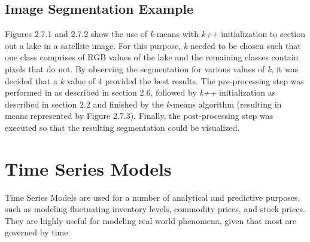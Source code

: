 \documentclass[12pt]{article}
\begin{document}
\subsection {Image Segmentation Example}
  \par Figures 2.7.1 and 2.7.2 show the use of \textit{k}-means with \textit{k++} initialization to section out a lake in a satellite image. For this purpose, \textit{k} needed to be chosen such that one class comprises of RGB values of the lake and the remaining classes contain pixels that do not. By observing the segmentation for various values of \textit{k}, it was decided that a \textit{k} value of 4 provided the best results. The pre-processing step was performed in as described in section 2.6, followed by \textit{k++} initialization as described in section 2.2 and finished by the \textit{k}-means algorithm (resulting in means represented by Figure 2.7.3). Finally, the post-processing step was executed so that the resulting segmentation could be visualized.

\pagebreak

\section {Time Series Models}
  \par Time Series Models are used for a number of analytical and predictive purposes, such as modeling fluctuating inventory levels, commodity prices, and stock prices. They are highly useful for modeling real world phenomena, given that most are governed by time.
\end{document}
